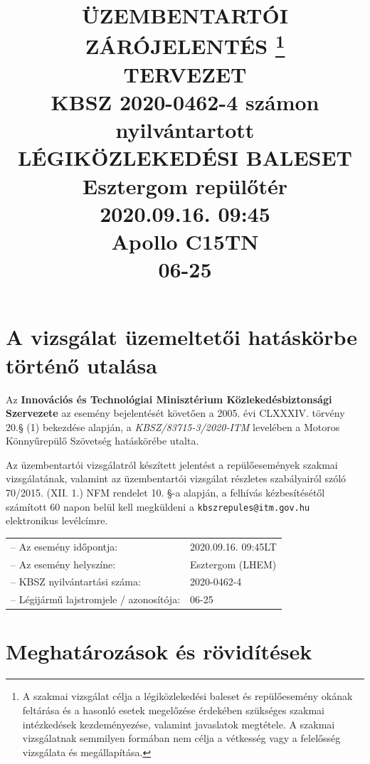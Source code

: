\documentclass[a4paper,10pt]{article}
\title{%
    \textbf{ÜZEMBENTARTÓI ZÁRÓJELENTÉS}    \thanks{\normalsize{A szakmai vizsgálat célja a 
    		légiközlekedési baleset és repülőesemény 
    		okának feltárása és a hasonló esetek megelőzése érdekében szükséges szakmai 
    		intézkedések kezdeményezése, valamint javaslatok megtétele. A szakmai 
    		vizsgálatnak semmilyen formában nem célja a vétkesség vagy a felelősség 
    		vizsgálata és megállapítása.}} \\ TERVEZET \\
    \vspace*{36pt}
    \textbf{KBSZ 2020-0462-4 számon nyilvántartott\\
    LÉGIKÖZLEKEDÉSI BALESET}\\
    \vspace*{24pt}
    Esztergom repülőtér\\
    \vspace*{24pt}
    2020.09.16. 09:45\\
    \vspace*{24pt}
    Apollo C15TN\\
    06-25\\
    \vspace*{5cm}
}
\author{}
\date{}
\begin{document}
\maketitle
\pagebreak
\pagestyle{fancy}
\tableofcontents
\listoffigures
\pagebreak

%

\pagebreak


\section*{A vizsgálat üzemeltetői hatáskörbe történő utalása}
Az \textbf{Innovációs és Technológiai Minisztérium Közlekedésbiztonsági 
Szervezete} az esemény bejelentését követően a 2005. évi CLXXXIV. törvény 20.§ 
(1) bekezdése alapján, a \textit{KBSZ/83715-3/2020-ITM} levelében a 
Motoros Könnyűrepülő Szövetség hatáskörébe utalta.

Az üzembentartói vizsgálatról készített jelentést a repülőesemények szakmai 
vizsgálatának, valamint az üzembentartói vizsgálat részletes szabályairól szóló 
70/2015. (XII. 1.) NFM rendelet  10. §-a alapján, a felhívás kézbesítésétől 
számított 60 napon belül kell megküldeni a \texttt{kbszrepules@itm.gov.hu} 
elektronikus levélcímre.\\

\begin{tabular}{ll}
  -- Az esemény időpontja:& 2020.09.16. 09:45LT\\
  -- Az esemény helyszíne:& Esztergom (LHEM)\\
  -- KBSZ nyilvántartási száma:& 2020-0462-4\\
  -- Légijármű lajstromjele / azonosítója:& 06-25\\
\end{tabular}

\section*{Meghatározások és rövidítések}
\end{document}
